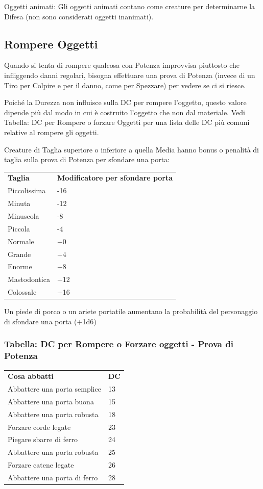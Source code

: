 \documentclass[a4paper,11pt,twoside,openany]{book}
\begin{document}
\bigskip

Oggetti animati: Gli oggetti animati contano come creature per determinarne la Difesa (non sono considerati oggetti inanimati).

\subsection{Rompere Oggetti}

\label{rompere-oggetti}

Quando si tenta di rompere qualcosa con Potenza improvvisa piuttosto che infliggendo danni regolari, bisogna effettuare una prova di Potenza (invece di un Tiro per Colpire e per il danno, come per Spezzare) per vedere se ci si riesce.

Poiché la Durezza non influisce sulla DC per rompere l'oggetto, questo valore dipende più dal modo in cui è costruito l'oggetto che non dal materiale. Vedi Tabella: DC per Rompere o forzare Oggetti per una lista delle DC più comuni relative al rompere gli oggetti.

Creature di Taglia superiore o inferiore a quella Media hanno bonus o penalità di taglia sulla prova di Potenza per sfondare una porta:

\bigskip

\begin{tabular}{ll}
	\toprule
	\textbf{Taglia} & \textbf{Modificatore per sfondare porta}\tabularnewline
	Piccolissima    & -16\tabularnewline
	Minuta          & -12\tabularnewline
	Minuscola       & -8\tabularnewline
	Piccola         & -4\tabularnewline
	Normale         & +0\tabularnewline
	Grande          & +4\tabularnewline
	Enorme          & +8\tabularnewline
	Mastodontica    & +12\tabularnewline
	Colossale       & +16\tabularnewline
\end{tabular}

\bigskip

Un piede di porco o un ariete portatile aumentano la probabilità del personaggio di sfondare una porta (+1d6)

\subsubsection{Tabella: DC per Rompere o Forzare oggetti - Prova di Potenza}

\label{tabella-dc-per-rompere-o-forzare-oggetti---prova-di-potenza}
\bigskip

\begin{tabular}{ll}
	\toprule
	\textbf{Cosa abbatti}        & \textbf{DC}\tabularnewline
	Abbattere una porta semplice & 13\tabularnewline
	Abbattere una porta buona    & 15\tabularnewline
	Abbattere una porta robusta  & 18\tabularnewline
	Forzare corde legate         & 23\tabularnewline
	Piegare sbarre di ferro      & 24\tabularnewline
	Abbattere una porta robusta  & 25\tabularnewline
	Forzare catene legate        & 26\tabularnewline
	Abbattere una porta di ferro & 28\tabularnewline
\end{tabular}
\bigskip
\end{document}
